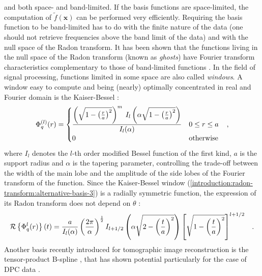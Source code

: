 {and both space- and band-limited. If the basis functions are space-limited, the computation of $\tilde{f}(\mathbf{x})$ can be 
performed very efficiently. Requiring the basis function to be band-limited has to do with the finite nature of the data
(one should not retrieve frequencies above the band limit of the data)
and with the null space of the Radon transform. It has been shown that the functions living in the null space
of the Radon transform (known as
\textit{ghosts}) have Fourier transform characteristics complementary to those of band-limited functions \cite{Louis1984}.
In the field of signal processing, functions limited in some space are also called \textit{windows}.
\newline 
A window easy to compute and being (nearly) optimally concentrated in real and Fourier domain is the Kaiser-Bessel \cite{Kaiser1966}:
\begin{equation}
  \Phi_{q}^{(l)}(r) = \begin{cases}
		     \displaystyle \frac{\left(\sqrt{1-\left(\frac{r}{a}\right)^{2}}\right)^{m}\:I_{l}\left(\alpha\sqrt{1-\left(\frac{r}{a}\right)^{2}}\right)}{I_{l}(\alpha)} & 0 \leq r \leq a\\
		     0 & \text{otherwise}
                \end{cases} \hspace{0.3cm},
\label{introduction:radon-transform:alternative-basis-3}                
\end{equation}
where $I_{l}$ denotes the $l$-th order modified Bessel function of the first kind, $a$ is the support radius
and $\alpha$ is the tapering parameter, controlling the trade-off between the width of the main lobe
and the amplitude of the side lobes of the Fourier transform of the function. Since the Kaiser-Bessel window
(\ref{introduction:radon-transform:alternative-basis-3}) is a radially symmetric function, the expression of
its Radon transform does not depend on $\theta$ \cite{Lewitt1990}:
\begin{equation}
  \operatorname{\mathcal{R}}\left\{\Phi_{q}^{l}(r)\right\}(t) = \frac{a}{I_{l}(\alpha)} \left(\frac{2\pi}{\alpha}\right)^{\frac{1}{2}}
  I_{l+1/2}\left(\alpha\sqrt{2-\left(\frac{t}{a}\right)^{2}}\right) \left[\sqrt{1-\left(\frac{t}{a}\right)^{2}}\right]^{l+1/2}\hspace{0.3cm}.
\end{equation}
Another basis recently introduced for tomographic image reconstruction is the tensor-product B-spline \cite{Horbelt2002},
that has shown potential particularly for the case of DPC data \cite{Nilchian2013}.
}
